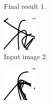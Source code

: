 \begin{figure}
\begin{subfigure}{.2\textwidth}
        \caption{Final result 1.}
    \end{subfigure}
    \begin{subfigure}{.2\textwidth}
        \includegraphics[width=\textwidth]{graphics/work-artifacts/iterative/full/3/C/test.png}
        \caption{Input image 2.}
    \end{subfigure}
    \begin{subfigure}{.2\textwidth}
        \includegraphics[width=\textwidth]{graphics/work-artifacts/iterative/full/3/C/test-final.png}

\end{subfigure}
\end{figure}
